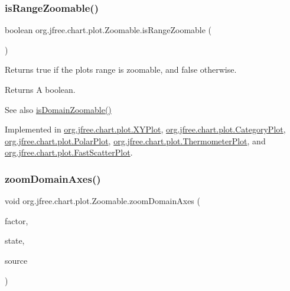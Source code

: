 \subsubsection{\texorpdfstring{is\+Range\+Zoomable()}{isRangeZoomable()}}
{\footnotesize\ttfamily boolean org.\+jfree.\+chart.\+plot.\+Zoomable.\+is\+Range\+Zoomable (\begin{DoxyParamCaption}{ }\end{DoxyParamCaption})}

Returns {\ttfamily true} if the plot\textquotesingle{}s range is zoomable, and {\ttfamily false} otherwise.

\begin{DoxyReturn}{Returns}
A boolean.
\end{DoxyReturn}
\begin{DoxySeeAlso}{See also}
\mbox{\hyperlink{interfaceorg_1_1jfree_1_1chart_1_1plot_1_1_zoomable_a7c10a2f8573d8238ce31a4ee8d7dd2db}{is\+Domain\+Zoomable()}} 
\end{DoxySeeAlso}


Implemented in \mbox{\hyperlink{classorg_1_1jfree_1_1chart_1_1plot_1_1_x_y_plot_a730a3fdcafdb45f7d21112631dec8d28}{org.\+jfree.\+chart.\+plot.\+X\+Y\+Plot}}, \mbox{\hyperlink{classorg_1_1jfree_1_1chart_1_1plot_1_1_category_plot_ae3587c02157e69eeb8909513982e3d23}{org.\+jfree.\+chart.\+plot.\+Category\+Plot}}, \mbox{\hyperlink{classorg_1_1jfree_1_1chart_1_1plot_1_1_polar_plot_a82c166269eb7715eec2faa1f042616be}{org.\+jfree.\+chart.\+plot.\+Polar\+Plot}}, \mbox{\hyperlink{classorg_1_1jfree_1_1chart_1_1plot_1_1_thermometer_plot_adc804a5ef2e701dfaf6911c33bd178f3}{org.\+jfree.\+chart.\+plot.\+Thermometer\+Plot}}, and \mbox{\hyperlink{classorg_1_1jfree_1_1chart_1_1plot_1_1_fast_scatter_plot_a3508600766d21adb9a8aa2a8fe121d71}{org.\+jfree.\+chart.\+plot.\+Fast\+Scatter\+Plot}}.

\mbox{\label{interfaceorg_1_1jfree_1_1chart_1_1plot_1_1_zoomable_abad274f3727b5d7498e9109ed0e9fdb2}} 
\subsubsection{\texorpdfstring{zoom\+Domain\+Axes()}{zoomDomainAxes()}\hspace{0.1cm}{\footnotesize\ttfamily [1/3]}}
{\footnotesize\ttfamily void org.\+jfree.\+chart.\+plot.\+Zoomable.\+zoom\+Domain\+Axes (\begin{DoxyParamCaption}\item[{double}]{factor,  }\item[{\mbox{\hyperlink{classorg_1_1jfree_1_1chart_1_1plot_1_1_plot_rendering_info}{Plot\+Rendering\+Info}}}]{state,  }\item[{Point2D}]{source }\end{DoxyParamCaption})}


